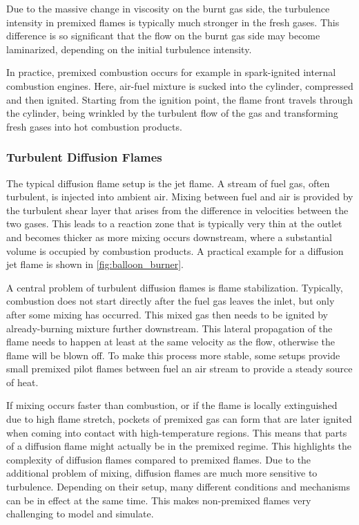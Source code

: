 %
Due to the massive change in viscosity on the burnt gas side, the turbulence
intensity in premixed flames is typically much stronger in the fresh gases.
%
This difference is so significant that the flow on the burnt gas side may become
laminarized, depending on the initial turbulence intensity.
%

%
In practice, premixed combustion occurs for example in spark-ignited internal
combustion engines.
%
Here, air-fuel mixture is sucked into the cylinder, compressed and then ignited.
%
Starting from the ignition point, the flame front travels through the cylinder,
being wrinkled by the turbulent flow of the gas and transforming fresh gases
into hot combustion products.
%
%
\subsubsection{Turbulent Diffusion Flames} %
\label{ssub:turbulent_diffusion_flames}
%
The typical diffusion flame setup is the jet flame.
%
A stream of fuel gas, often turbulent, is injected into ambient air.
%
Mixing between fuel and air is provided by the turbulent shear layer that arises
from the difference in velocities between the two gases.
%
This leads to a reaction zone that is typically very thin at the outlet and
becomes thicker as more mixing occurs downstream, where a substantial volume is
occupied by combustion products.
%
A practical example for a diffusion jet flame is shown in
\cref{fig:balloon_burner}.
%

%
A central problem of turbulent diffusion flames is flame stabilization.
%
Typically, combustion does not start directly after the fuel gas leaves the
inlet, but only after some mixing has occurred.
%
This mixed gas then needs to be ignited by already-burning mixture further
downstream.
%
This lateral propagation of the flame needs to happen at least at the same
velocity as the flow, otherwise the flame will be blown off.
%
To make this process more stable, some setups provide small premixed pilot
flames between fuel an air stream to provide a steady source of heat.
%

%
If mixing occurs faster than combustion, or if the flame is locally extinguished
due to high flame stretch, pockets of premixed gas can form that are later
ignited when coming into contact with high-temperature regions.
%
This means that parts of a diffusion flame might actually be in the premixed
regime.
%
This highlights the complexity of diffusion flames compared to premixed flames.
%
Due to the additional problem of mixing, diffusion flames are much more
sensitive to turbulence.
%
Depending on their setup, many different conditions and mechanisms can be in
effect at the same time.
%
This makes non-premixed flames very challenging to model and simulate.
%
%
%
